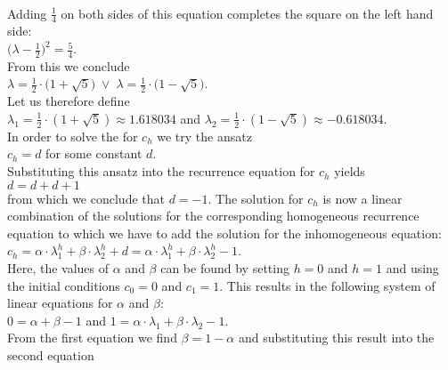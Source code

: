 \\[0.2cm]
Adding $\frac{1}{4}$ on both sides of this equation completes the square on the left hand side:
\\[0.2cm]
\hspace*{1.3cm}
$\bigl(\lambda - \frac{1}{2}\bigr)^2 = \frac{5}{4}$. 
\\[0.2cm]
From this we conclude 
\\[0.2cm]
\hspace*{1.3cm}
$\lambda = \frac{1}{2} \cdot \bigl(1 + \sqrt{5}\bigr) \;\vee\; \lambda = \frac{1}{2} \cdot \bigl(1 - \sqrt{5}\bigr)$.
\\[0.2cm]
Let us therefore define 
\\[0.2cm]
\hspace*{1.3cm}
$\lambda_1 =  \frac{1}{2} \cdot (1 + \sqrt{5}) \approx  1.618034$ \quad and \quad 
$\lambda_2 = \frac{1}{2} \cdot (1 - \sqrt{5}) \approx -0.618034$.
\\[0.2cm]
In order to solve the  for $c_h$ we try the ansatz
\\[0.2cm]
\hspace*{1.3cm}
$c_h = d$ \quad for some constant $d$.
\\[0.2cm]
Substituting this ansatz into the recurrence equation for $c_h$ yields
\\[0.2cm]
\hspace*{1.3cm}
$d = d + d + 1$
\\[0.2cm]
from which we conclude that $d = -1$.  The solution for $c_h$ is now a linear combination of the solutions for
the corresponding homogeneous recurrence equation to which we have to add the solution for the inhomogeneous equation:
\\[0.2cm]
\hspace*{1.3cm}
$c_h = \alpha \cdot \lambda_1^h + \beta \cdot \lambda_2^h + d =\alpha \cdot \lambda_1^h + \beta \cdot \lambda_2^h - 1$.
\\[0.2cm]
Here, the values of $\alpha$ and $\beta$ can be found by setting $h=0$ and $h=1$ and using the
initial conditions $c_0 = 0$ and $c_1 = 1$.  This results in
the following system of linear equations for  $\alpha$ and $\beta$:
\\[0.2cm]
\hspace*{1.3cm}
$0 = \alpha + \beta - 1$ \quad and \quad
$1 = \alpha \cdot \lambda_1 + \beta \cdot \lambda_2 - 1$.
\\[0.2cm]
From the first equation we find $\beta = 1-\alpha$ and substituting this result into the second equation
